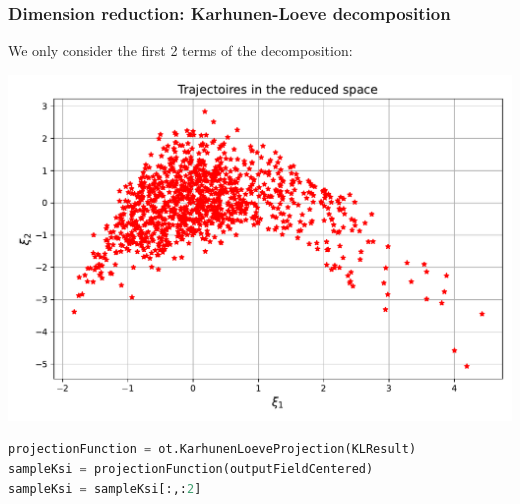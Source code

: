 \documentclass{beamer}
\begin{document}

\begin{frame}[containsverbatim]
\frametitle{Dimension reduction: Karhunen-Loeve decomposition}

\scriptsize

We only consider the first 2 terms of the decomposition:

\centering
\includegraphics[width=.7\textwidth]{figures/Reduced_Space.pdf}

\begin{lstlisting}[language=Python, numbers = none]
projectionFunction = ot.KarhunenLoeveProjection(KLResult)
sampleKsi = projectionFunction(outputFieldCentered)
sampleKsi = sampleKsi[:,:2]
\end{lstlisting}

\end{frame}

\end{document}
